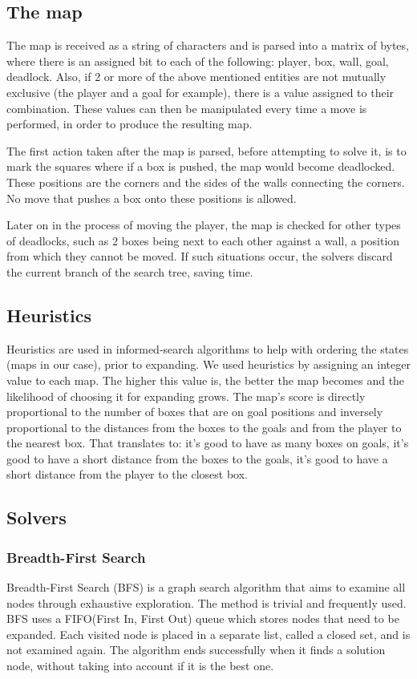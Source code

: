 \subsection {The map}
The map is received as a string of characters and is parsed into a matrix of bytes, where there is an assigned bit to each of the following: player, box, wall, goal, deadlock. Also, if 2 or more of the above mentioned entities are not mutually exclusive (the player and a goal for example), there is a value assigned to their combination.  These values can then be manipulated every time a move is performed, in order to produce the resulting map.

The first action taken after the map is parsed, before attempting to solve it, is to mark the squares where if a box is pushed, the map would become deadlocked. These positions are the corners and the sides of the walls connecting the corners. No move that pushes a box onto these positions is allowed.

Later on in the process of moving the player, the map is checked for other types of deadlocks, such as 2 boxes being next to each other against a wall, a position from which they cannot be moved. If such situations occur, the solvers discard the current branch of the search tree, saving time.

\subsection{Heuristics}\label{Heuristics}
Heuristics are used in informed-search algorithms to help with ordering the states (maps in our case), prior to expanding. We used heuristics by assigning an integer value to each map. The higher this value is, the better the map becomes and the likelihood of choosing it for expanding grows. The map's score is directly proportional to the number of boxes that are on goal positions and inversely proportional to the distances from the boxes to the goals and from the player to the nearest box. That translates to: it's good to have as many boxes on goals, it's good to have a short distance from the boxes to the goals, it's good to have a short distance from the player to the closest box.

\subsection{Solvers}\label{solvers}
\subsubsection{Breadth-First Search}
Breadth-First Search (BFS) is a graph search algorithm that aims to examine all nodes through exhaustive exploration. The method is trivial and frequently used. BFS uses a FIFO(First In, First Out) queue which stores nodes that need to be expanded. Each visited node is placed in a separate  list, called a closed set, and is not examined again. The algorithm ends successfully when it finds a solution node, without taking into account if it is the best one.

